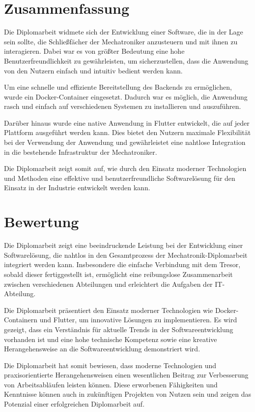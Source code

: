 \section{Zusammenfassung}
Die Diplomarbeit widmete sich der Entwicklung einer Software, die in der Lage sein sollte, die Schließfächer der Mechatroniker anzusteuern und mit ihnen zu interagieren. Dabei war es von größter Bedeutung eine hohe Benutzerfreundlichkeit zu gewährleisten, um sicherzustellen, dass die Anwendung von den Nutzern einfach und intuitiv bedient werden kann. 

Um eine schnelle und effiziente Bereitstellung des Backends zu ermöglichen, wurde ein Docker-Container eingesetzt. Dadurch war es möglich, die Anwendung rasch und einfach auf verschiedenen Systemen zu installieren und auszuführen.

Darüber hinaus wurde eine native Anwendung in Flutter entwickelt, die auf jeder Plattform ausgeführt werden kann. Dies bietet den Nutzern maximale Flexibilität bei der Verwendung der Anwendung und gewährleistet eine nahtlose Integration in die bestehende Infrastruktur der Mechatroniker.

Die Diplomarbeit zeigt somit auf, wie durch den Einsatz moderner Technologien und Methoden eine effektive und benutzerfreundliche Softwarelösung für den Einsatz in der Industrie entwickelt werden kann.

\section{Bewertung}

Die Diplomarbeit zeigt eine beeindruckende Leistung bei der Entwicklung einer Softwarelösung, die nahtlos in den Gesamtprozess der Mechatronik-Diplomarbeit integriert werden kann. Insbesondere die einfache Verbindung mit dem Tresor, sobald dieser fertiggestellt ist, ermöglicht eine reibungslose Zusammenarbeit zwischen verschiedenen Abteilungen und erleichtert die Aufgaben der IT-Abteilung.

Die Diplomarbeit präsentiert den Einsatz moderner Technologien wie Docker-Containern und Flutter, um innovative Lösungen zu implementieren. Es wird gezeigt, dass ein Verständnis für aktuelle Trends in der Softwareentwicklung vorhanden ist und eine hohe technische Kompetenz sowie eine kreative Herangehensweise an die Softwareentwicklung demonstriert wird.

Die Diplomarbeit hat somit bewiesen, dass moderne Technologien und praxisorientierte Herangehensweisen einen wesentlichen Beitrag zur Verbesserung von Arbeitsabläufen leisten können. Diese erworbenen Fähigkeiten und Kenntnisse können auch in zukünftigen Projekten von Nutzen sein und zeigen das Potenzial einer erfolgreichen Diplomarbeit auf.

